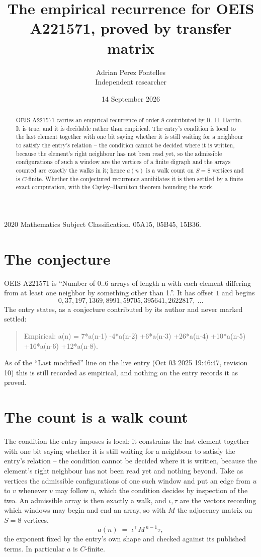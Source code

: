 \documentclass[11pt,a4paper]{article}
\title{The empirical recurrence for OEIS A221571, proved by transfer matrix}
\author{Adrian Perez Fontelles\\ \small Independent researcher}
\date{14 September 2026}
\theoremstyle{plain}
\theoremstyle{definition}
\begin{document}
\maketitle

\begin{abstract}
OEIS A221571 carries an empirical recurrence of order $8$ contributed by R. H. Hardin. It is
true, and it is decidable rather than empirical. The entry's condition is local to the last element together with one bit saying whether it is still waiting for a neighbour to satisfy the entry's relation -- the condition cannot be decided where it is written, because the element's right neighbour has not been read yet, so
the admissible configurations of such a window are the vertices of a finite digraph and the
arrays counted are exactly the walks in it; hence $a(n)$ is a walk count on $S=8$ vertices
and is $C$-finite. Whether the conjectured recurrence annihilates it is then settled by a
finite exact computation, with the Cayley--Hamilton theorem bounding the work.
\end{abstract}

\noindent\small 2020 Mathematics Subject Classification. 05A15, 05B45, 15B36.\normalsize

\section{The conjecture}

OEIS A221571 is ``Number of 0..6 arrays of length n with each element differing from at least one neighbor by something other than 1.''. It has offset $1$ and begins
\[
0, 37, 197, 1369, 8991, 59705, 395641, 2622817,\ \dots
\]
The entry states, as a conjecture contributed by its author and never marked settled:
\begin{quote}
Empirical: a(n) = 7*a(n-1) -4*a(n-2) +6*a(n-3) +26*a(n-4) +10*a(n-5) +16*a(n-6) +12*a(n-8).
\end{quote}
As of the ``Last modified'' line on the live entry (Oct 03 2025 19:46:47, revision 10) this is still
recorded as empirical, and nothing on the entry records it as proved.

\section{The count is a walk count}

The condition the entry imposes is local: it constrains the last element together with one bit saying whether it is still waiting for a neighbour to satisfy the entry's relation -- the condition cannot be decided where it is written, because the element's right neighbour has not been read yet and nothing beyond. Take as vertices the admissible configurations of one such window and put an edge from $u$ to $v$ whenever $v$ may follow $u$, which the condition decides by inspection of the two.
An admissible array is then exactly a walk, and $\iota,\tau$ are the vectors recording which windows may begin and end an array, so with $M$ the adjacency matrix on $S=8$ vertices,
\[
a(n)\;=\;\iota^{\!\top}M^{\,n-1}\tau ,
\]
the exponent fixed by the entry's own shape and checked against its published terms. In
particular $a$ is $C$-finite.
\end{document}
